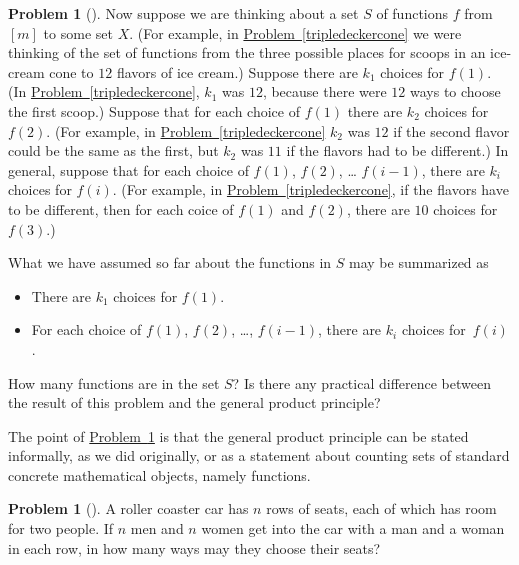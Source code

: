 \documentclass[10pt,]{book}
\theoremstyle{plain}
\theoremstyle{definition}
\newtheorem{activity}[project]{Problem}
\theoremstyle{definition}
\numberwithin{equation}{chapter}
\newcommand{\importantarrow}{\Rightarrow}
\begin{document}
\begin{activity}[] \label{generalproductprinciple}
Now suppose we are thinking about a set \(S\) of functions \(f\) from \([m]\) to some set \(X\). (For example, in \hyperref[tripledeckercone]{Problem~\ref{tripledeckercone}} we were thinking of the set of functions from the three possible places for scoops in an ice-cream cone to \(12\) flavors of ice cream.) Suppose there are \(k_1\) choices for \(f(1)\). (In \hyperref[tripledeckercone]{Problem~\ref{tripledeckercone}}, \(k_1\) was \(12\), because there were \(12\) ways to choose the first scoop.) Suppose that for each choice of \(f(1)\) there are \(k_2\) choices for \(f(2)\). (For example, in \hyperref[tripledeckercone]{Problem~\ref{tripledeckercone}} \(k_2\) was \(12\) if the second flavor could be the same as the first, but \(k_2\) was \(11\) if the flavors had to be different.) In general, suppose that for each choice of \(f(1)\), \(f(2)\), \dots{} \(f(i-1)\), there are \(k_i\) choices for \(f(i)\). (For example, in \hyperref[tripledeckercone]{Problem~\ref{tripledeckercone}}, if the flavors have to be different, then for each coice of \(f(1)\) and \(f(2)\), there are \(10\) choices for \(f(3)\).)%
\par
What we have assumed so far about the functions in \(S\) may be summarized as \leavevmode%
\begin{itemize}[label=\textbullet]
\item{}There are \(k_1\) choices for \(f(1)\).%
\item{}For each choice of \(f(1)\), \(f(2)\), \dots{}, \(f(i-1)\), there are \(k_i\) choices for~\(f(i)\).%
\end{itemize}
%
\par
How many functions are in the set \(S\)? Is there any practical difference between the result of this problem and the general product principle?%
\end{activity}
The point of \hyperref[generalproductprinciple]{Problem~\ref{generalproductprinciple}} is that the general product principle can be stated informally, as we did originally, or as a statement about counting sets of standard concrete mathematical objects, namely functions.%
\begin{activity}[]\marginsymbol[-1em]{\pdftooltip{$\importantarrow$}{especially interesting}} \label{activity-15}
A roller coaster car has \(n\) rows of seats, each of which has room for two people. If \(n\) men and \(n\) women get into the car with a man and a woman in each row, in how many ways may they choose their seats?%
\end{activity}
\end{document}
